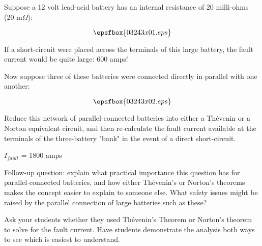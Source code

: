 

Suppose a 12 volt lead-acid battery has an internal resistance of 20 milli-ohms (20 m$\Omega$):

$$\epsfbox{03243x01.eps}$$

If a short-circuit were placed across the terminals of this large battery, the fault current would be quite large: 600 amps!

Now suppose three of these batteries were connected directly in parallel with one another:

$$\epsfbox{03243x02.eps}$$

Reduce this network of parallel-connected batteries into either a Th\'evenin or a Norton equivalent circuit, and then re-calculate the fault current available at the terminals of the three-battery "bank" in the event of a direct short-circuit.







$I_{fault}$ = 1800 amps

\vskip 10pt

Follow-up question: explain what practical importance this question has for parallel-connected batteries, and how either Th\'evenin's or Norton's theorems makes the concept easier to explain to someone else.  What safety issues might be raised by the parallel connection of large batteries such as these?







Ask your students whether they used Th\'evenin's Theorem or Norton's theorem to solve for the fault current.  Have students demonstrate the analysis both ways to see which is easiest to understand.




